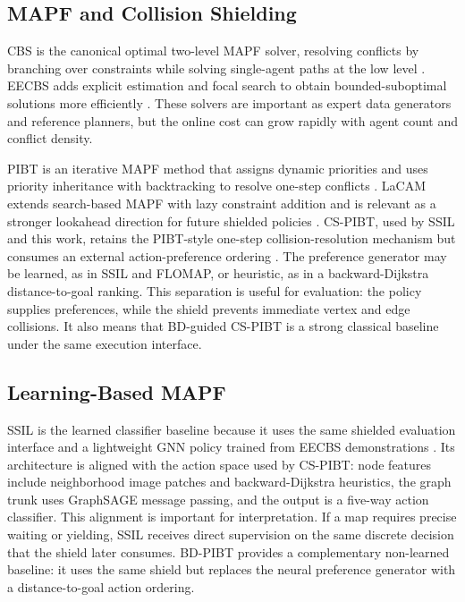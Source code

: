 \documentclass[conference]{IEEEtran}
\begin{document}
\subsection{MAPF and Collision Shielding}

CBS is the canonical optimal two-level MAPF solver, resolving conflicts by
branching over constraints while solving single-agent paths at the low level
\cite{sharon2015cbs}.  EECBS adds explicit estimation and focal search to obtain
bounded-suboptimal solutions more efficiently \cite{li2021eecbs}.  These solvers
are important as expert data generators and reference planners, but the online
cost can grow rapidly with agent count and conflict density.

PIBT is an iterative MAPF method that assigns dynamic priorities and uses
priority inheritance with backtracking to resolve one-step conflicts
\cite{okumura2019pibt}.  LaCAM extends search-based MAPF with lazy constraint
addition and is relevant as a stronger lookahead direction for future shielded
policies \cite{okumura2023lacam}.  CS-PIBT, used by SSIL and this work,
retains the PIBT-style one-step collision-resolution mechanism but consumes an
external action-preference ordering \cite{veerapaneni2025wsnh}.  The preference
generator may be learned, as in SSIL and FLOMAP, or heuristic, as in a
backward-Dijkstra distance-to-goal ranking.  This separation is useful for
evaluation: the policy supplies preferences, while the shield prevents immediate
vertex and edge collisions.  It also means that BD-guided CS-PIBT is a strong
classical baseline under the same execution interface.

\subsection{Learning-Based MAPF}

SSIL is the learned classifier baseline because it uses the same shielded
evaluation interface and a lightweight GNN policy trained from EECBS
demonstrations \cite{veerapaneni2025wsnh}.  Its architecture is aligned with
the action space used by CS-PIBT: node features include neighborhood image
patches and backward-Dijkstra heuristics, the graph trunk uses GraphSAGE
message passing, and the output is a five-way action classifier.  This alignment
is important for interpretation.  If a map requires precise waiting or yielding,
SSIL receives direct supervision on the same discrete decision that the shield
later consumes.  BD-PIBT provides a complementary non-learned baseline: it uses
the same shield but replaces the neural preference generator with a
distance-to-goal action ordering.
\end{document}
